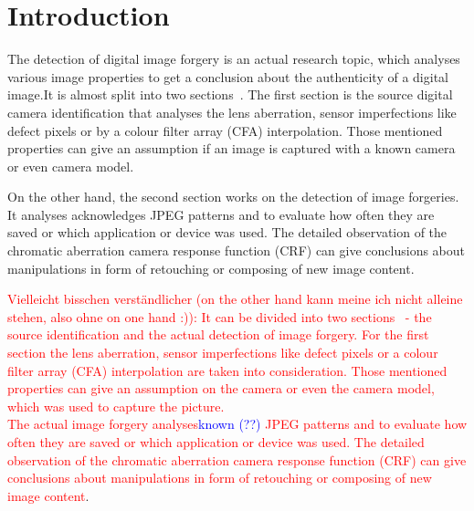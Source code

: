 \section{Introduction}\label{sec:Introduction}
The detection of digital image forgery is an actual research topic, which analyses various image properties to get a conclusion about the authenticity of a digital image.It is almost split into two sections~\cite{4284575}. The first section is the source digital camera identification that analyses the lens aberration, sensor imperfections like defect pixels or by a colour filter array (CFA) interpolation. Those mentioned properties can give an assumption if an image is captured with a known camera or even camera model.

On the other hand, the second section works on the detection of image forgeries. It analyses acknowledges JPEG patterns and to evaluate how often they are saved or which application or device was used. The detailed observation of the chromatic aberration camera response function (CRF) can give conclusions about manipulations in form of retouching or composing of new image content. 

 \textcolor{red}{Vielleicht bisschen verständlicher (on the other hand kann meine ich nicht alleine stehen, also ohne on one hand :)): It can be divided into two sections~\cite{4284575} - the source identification and the actual detection of image forgery. For the first section the lens aberration, sensor imperfections like defect pixels or a colour filter array (CFA) interpolation are taken into consideration. Those mentioned properties can give an assumption on the camera or even the camera model, which was used to capture the picture.\\
The actual image forgery analyses}\textcolor{blue}{known (??)} \textcolor{red}{ JPEG patterns and to evaluate how often they are saved or which application or device was used. The detailed observation of the chromatic aberration camera response function (CRF) can give conclusions about manipulations in form of retouching or composing of new image content}. 

